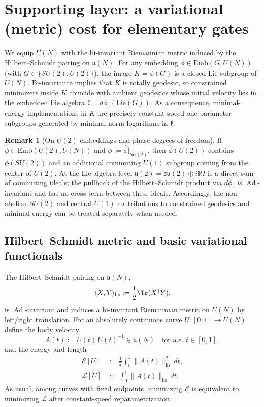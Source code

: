 \documentclass{article}%
\theoremstyle{definition}
\newtheorem{remark}[theorem]{Remark}
\numberwithin{equation}{section}
\newcommand{\R}{\mathbb{R}}
\newcommand{\Emb}{\mathrm{Emb}}
\newcommand{\Lie}{\mathrm{Lie}}
\DeclareMathOperator{\Ad}{Ad}
\begin{document}
\section{Supporting layer: a variational (metric) cost for elementary gates}
\label{sec:variational_principle}

\noindent
We equip $U(N)$ with the bi-invariant Riemannian metric induced by the Hilbert--Schmidt pairing on $\mathfrak u(N)$.
For any embedding $\phi\in\Emb(G,U(N))$ (with $G\in\{SU(2),U(2)\}$), the image $K=\phi(G)$ is a closed Lie subgroup of $U(N)$.
Bi-invariance implies that $K$ is totally geodesic, so constrained minimizers inside $K$ coincide with ambient geodesics whose initial
velocity lies in the embedded Lie algebra $\mathfrak{k}=d\phi_e(\Lie(G))$.
As a consequence, minimal-energy implementations in $K$ are precisely constant-speed one-parameter subgroups generated by
minimal-norm logarithms in $\mathfrak{k}$.

\begin{remark}[On $U(2)$ embeddings and phase degrees of freedom]\label{rem:U2_vs_SU2_variational}
If $\widehat\phi\in\Emb(U(2),U(N))$ and $\phi:=\widehat\phi|_{SU(2)}$, then $\widehat\phi(U(2))$ contains $\phi(SU(2))$ and an
additional commuting $U(1)$ subgroup coming from the center of $U(2)$.
At the Lie-algebra level $\mathfrak u(2)=\mathfrak{su}(2)\oplus i\R I$ is a direct sum of commuting ideals; the pullback of the
Hilbert--Schmidt product via $d\widehat\phi_e$ is $\Ad$-invariant and has no cross-term between these ideals.
Accordingly, the non-abelian $SU(2)$ and central $U(1)$ contributions to constrained geodesics and minimal energy can be treated
separately when needed.
\end{remark}


\subsection{Hilbert--Schmidt metric and basic variational functionals}
\label{subsec:HS_metric_functionals}

The Hilbert--Schmidt pairing on $\mathfrak u(N)$,
\[
\langle X,Y\rangle_{\mathrm{hs}}:=\frac12\Tr(X^\dagger Y),
\]
is $\Ad$-invariant and induces a bi-invariant Riemannian metric on $U(N)$ by left/right translation.
For an absolutely continuous curve $U:[0,1]\to U(N)$ define the body velocity
\[
A(t):=\dot U(t)\,U(t)^{-1}\in\mathfrak{u}(N)\quad\text{for a.e.\ }t\in[0,1],
\]
and the energy and length
\begin{align}
\mathcal{E}[U]
&:=\frac12\int_0^1 \|A(t)\|_{\mathrm{hs}}^2\,dt,
\label{eq:energy_functional}
\\
\mathcal{L}[U]
&:=\int_0^1 \|A(t)\|_{\mathrm{hs}}\,dt.
\label{eq:length_functional}
\end{align}
As usual, among curves with fixed endpoints, minimizing $\mathcal{E}$ is equivalent to minimizing $\mathcal{L}$ after
constant-speed reparametrization.
\end{document}
